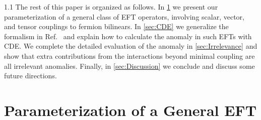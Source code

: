 \documentclass[a4paper,12pt]{article}
\begin{document}
\begin{spacing}{1.1}
The rest of this paper is organized as follows. In \cref{sec:Parameterization} we present our parameterization of a general class of EFT operators, involving scalar, vector, and tensor couplings to fermion bilinears. In \cref{sec:CDE} we generalize the formalism in Ref.~\cite{Paper1} and explain how to calculate the anomaly in such EFTs with CDE. We complete the detailed evaluation of the anomaly in \cref{sec:Irrelevance} and show that extra contributions from the interactions beyond minimal coupling are all irrelevant anomalies. Finally, in \cref{sec:Discussion} we conclude and discuss some future directions.



\section{Parameterization of a General EFT}
\label{sec:Parameterization}


\end{spacing}
\end{document}
